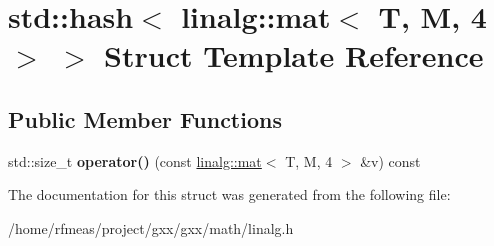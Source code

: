 \hypertarget{structstd_1_1hash_3_01linalg_1_1mat_3_01T_00_01M_00_014_01_4_01_4}{}\section{std\+:\+:hash$<$ linalg\+:\+:mat$<$ T, M, 4 $>$ $>$ Struct Template Reference}
\label{structstd_1_1hash_3_01linalg_1_1mat_3_01T_00_01M_00_014_01_4_01_4}
\subsection*{Public Member Functions}
\begin{DoxyCompactItemize}
\item 
std\+::size\+\_\+t {\bfseries operator()} (const \hyperlink{structlinalg_1_1mat}{linalg\+::mat}$<$ T, M, 4 $>$ \&v) const \hypertarget{structstd_1_1hash_3_01linalg_1_1mat_3_01T_00_01M_00_014_01_4_01_4_ac06425f9acd7c61f7475b49cd3455632}{}\label{structstd_1_1hash_3_01linalg_1_1mat_3_01T_00_01M_00_014_01_4_01_4_ac06425f9acd7c61f7475b49cd3455632}

\end{DoxyCompactItemize}


The documentation for this struct was generated from the following file\+:\begin{DoxyCompactItemize}
\item 
/home/rfmeas/project/gxx/gxx/math/linalg.\+h\end{DoxyCompactItemize}
